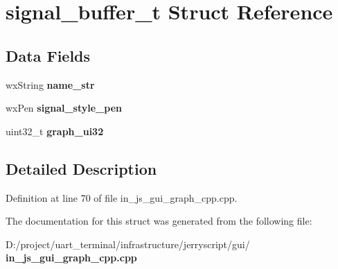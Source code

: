 \section{signal\+\_\+buffer\+\_\+t Struct Reference}
\label{structsignal__buffer__t}
\subsection*{Data Fields}
\begin{DoxyCompactItemize}
\item 
\mbox{\label{structsignal__buffer__t_a4f420117d8c68001f3c555687fee0d84}} 
wx\+String {\bfseries name\+\_\+str}
\item 
\mbox{\label{structsignal__buffer__t_a9ca1806bdffcf2b5ec036202957ec74e}} 
wx\+Pen {\bfseries signal\+\_\+style\+\_\+pen}
\item 
\mbox{\label{structsignal__buffer__t_a88b278f90960a1b582874b89be1146ac}} 
uint32\+\_\+t {\bfseries graph\+\_\+ui32}
\end{DoxyCompactItemize}


\subsection{Detailed Description}


Definition at line 70 of file in\+\_\+js\+\_\+gui\+\_\+graph\+\_\+cpp.\+cpp.



The documentation for this struct was generated from the following file\+:\begin{DoxyCompactItemize}
\item 
D\+:/project/uart\+\_\+terminal/infrastructure/jerryscript/gui/\textbf{ in\+\_\+js\+\_\+gui\+\_\+graph\+\_\+cpp.\+cpp}\end{DoxyCompactItemize}
